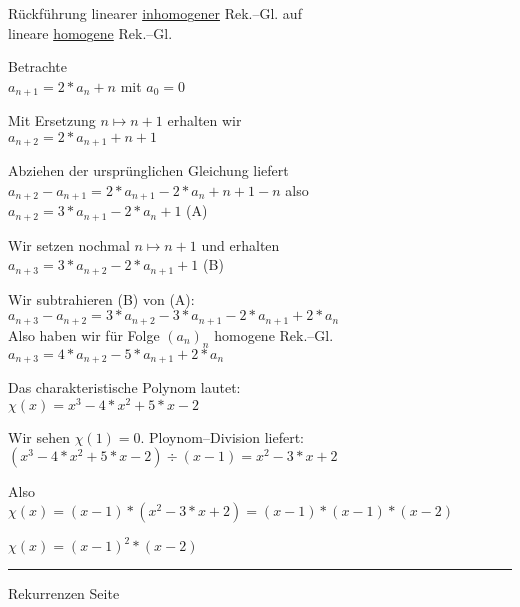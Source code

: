 \begin{slide}{}
\footnotesize

\begin{center}
R\"uckf\"uhrung linearer \underline{inhomo}g\underline{ener} Rek.--Gl. auf \\[0.3cm]
lineare \underline{homo}g\underline{ene} Rek.--Gl.
\end{center}
\vspace*{0.5cm}

Betrachte \\[0.3cm]
\hspace*{1.3cm} $a_{n+1} = 2 * a_n + n$ \quad mit $a_0 = 0$

Mit Ersetzung $n \mapsto n + 1$ erhalten wir \\[0.3cm]
\hspace*{1.3cm} $a_{n+2} = 2 * a_{n+1} + n + 1$

Abziehen der urspr\"unglichen Gleichung liefert \\[0.3cm]
\hspace*{1.3cm} $a_{n+2} - a_{n+1} = 2 * a_{n+1} - 2 * a_n + n + 1 - n$ \quad also \\[0.3cm]
\hspace*{1.3cm} $a_{n+2} = 3 * a_{n+1} - 2 * a_n + 1$ \hspace*{\fill} (A)

Wir setzen nochmal $n \mapsto n + 1$ und erhalten \\[0.3cm]
\hspace*{1.3cm} $a_{n+3} = 3 * a_{n+2} - 2 * a_{n+1} + 1$ \hspace*{\fill} (B)

Wir subtrahieren (B) von (A): \\[0.3cm]
\hspace*{1.3cm} $a_{n+3} - a_{n+2} = 3 * a_{n+2} - 3 * a_{n + 1} - 2 * a_{n + 1} + 2 * a_n$\\[0.3cm]
Also haben wir f\"ur Folge $(a_n)_n$ homogene Rek.--Gl. \\[0.3cm]
\hspace*{1.3cm} $a_{n+3} = 4 * a_{n+2} - 5 * a_{n + 1} + 2 * a_n$ 

Das charakteristische Polynom lautet: \\[0.3cm]
\hspace*{1.3cm} $\chi(x) = x^3 - 4 * x^2 + 5 * x - 2$ 

Wir sehen $\chi(1) = 0$.  Ploynom--Division liefert: \\[0.3cm]
\hspace*{1.3cm} $(x^3 - 4 * x^2 + 5 * x - 2) \div (x - 1) = x^2 - 3*x + 2$

Also \\[0.3cm]
\hspace*{1.3cm} $\chi(x) = (x - 1) * (x^2 - 3*x + 2) = (x - 1) * (x - 1) * (x - 2)$ 

\hspace*{1.3cm} $\chi(x) = (x - 1)^2 * (x - 2)$

\vspace*{\fill}
\tiny \addtocounter{mypage}{1}
\rule{17cm}{1mm}
Rekurrenzen  \hspace*{\fill} Seite 
\end{slide}

